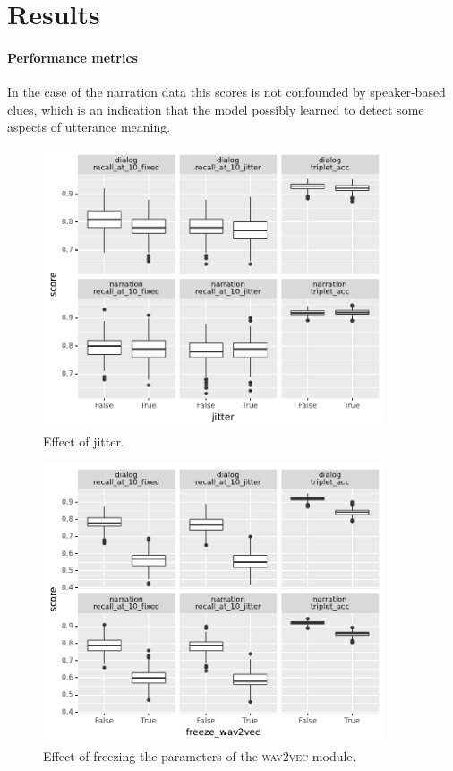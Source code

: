 \section{Results}
\label{sec:results}
\paragraph{Performance metrics}


In the case of the narration data this scores is not confounded by
speaker-based clues, which is an indication that the model possibly
learned to detect some aspects of utterance meaning. 

\begin{figure}[htb]
  \centering
  \includegraphics[width=0.9\textwidth]{results/ablations/jitter.pdf}
  \caption{Effect of jitter.}
  \label{fig:jitter}
\end{figure}

\begin{figure}[htb]
  \centering
  \includegraphics[width=0.9\textwidth]{results/ablations/freeze_wav2vec.pdf}
  \caption{Effect of freezing the parameters of the \textsc{wav2vec} module.}
  \label{fig:freeze_wav2vec}
\end{figure}

